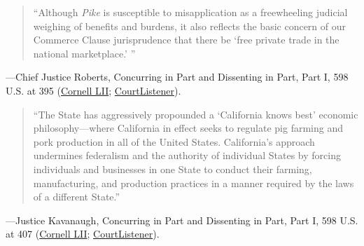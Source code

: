 \documentclass[12pt]{article}
\begin{document}
\begin{quote}
``Although \textit{Pike} is susceptible to misapplication as a freewheeling judicial weighing of benefits and burdens, it also reflects the basic concern of our Commerce Clause jurisprudence that there be `free private trade in the national marketplace.' ''
\end{quote}
---Chief Justice Roberts, Concurring in Part and Dissenting in Part, Part I, 598 U.S. at 395 (\href{https://www.law.cornell.edu/supremecourt/text/21-468}{Cornell LII}; \href{https://www.courtlistener.com/opinion/10049695/national-pork-producers-council-v-ross/}{CourtListener}).

\begin{quote}
``The State has aggressively propounded a `California knows best' economic philosophy---where California in effect seeks to regulate pig farming and pork production in all of the United States. California's approach undermines federalism and the authority of individual States by forcing individuals and businesses in one State to conduct their farming, manufacturing, and production practices in a manner required by the laws of a different State.''
\end{quote}
---Justice Kavanaugh, Concurring in Part and Dissenting in Part, Part I, 598 U.S. at 407 (\href{https://www.law.cornell.edu/supremecourt/text/21-468}{Cornell LII}; \href{https://www.courtlistener.com/opinion/10049695/national-pork-producers-council-v-ross/}{CourtListener}).
\end{document}
